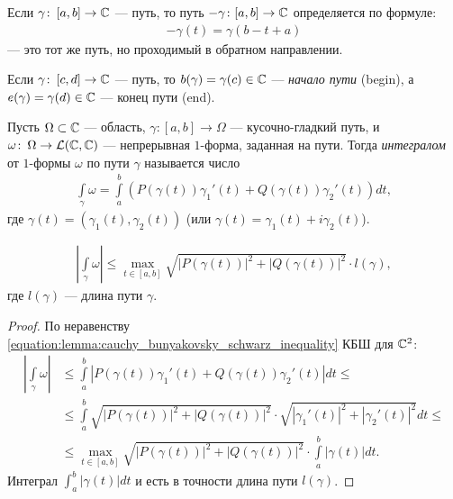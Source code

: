 \begin{notatn*}
 Если $\gamma \colon\, [a,b] \to \mathbb{C}$ --- путь, то путь $-\gamma \colon [a,b] \to \mathbb{C}$ определяется по формуле:
 \begin{align*}
  -\gamma(t) = \gamma(b - t + a)
 \end{align*} --- это тот же путь, но проходимый в обратном направлении.
\end{notatn*}
\begin{notatn*}
 Если $\gamma \colon\, [c, d] \to \mathbb{C}$ --- путь, то $b(\gamma) = \gamma(c) \in \mathbb{C}$ --- \textit{начало пути} (begin), а $e(\gamma) = \gamma(d) \in \mathbb{C}$ --- конец пути (end).
\end{notatn*}
\begin{df*}
 Пусть $\Omega \subset \mathbb{C}$ --- область, $\gamma \colon [a,b] \to \Omega$ --- кусочно-гладкий путь, и $\omega \colon\, \Omega \to \mathcal{L}(\mathbb{C}, \mathbb{C})$  --- непрерывная $1$-форма, заданная на пути. Тогда \textit{интегралом} от $1$-формы $\omega$ по пути  $\gamma$ называется число
  \begin{align*}
  \int\limits_{\gamma} \omega = \int\limits_{a}^{b} \left( P(\gamma(t)) \gamma_1'(t) + Q(\gamma(t)) \gamma_2'(t) \right) dt,
 \end{align*} где $\gamma(t) = (\gamma_1(t),\gamma_2(t))$ (или $\gamma(t) = \gamma_1(t) + i \gamma_2(t)$).
\end{df*}
\begin{lm}
 \begin{align*}
  \left| \int\limits_{\gamma} \omega  \right| \leqslant \max_{t \in [a,b]} \sqrt{\left| P(\gamma(t)) \right|^{2} + \left| Q(\gamma(t)) \right|^{2}} \cdot l(\gamma),
 \end{align*} где $l(\gamma)$ --- длина пути $\gamma$.
\end{lm}
\begin{proof}
 По неравенству \eqref{equation:lemma:cauchy_bunyakovsky_schwarz_inequality} КБШ для $\mathbb{C}^{2}$:
 \begin{align*}
  \left| \int\limits_{\gamma} \omega  \right| &\leqslant \int\limits_{a}^{b} \left| P(\gamma(t))\gamma_1'(t) + Q(\gamma(t))\gamma_2'(t) \right|dt \leqslant \\
  &\leqslant \int\limits_{a}^{b} \sqrt{\left| P(\gamma(t)) \right|^{2} + \left| Q(\gamma(t)) \right|^{2}} \cdot \sqrt{\left| \gamma_1'(t) \right|^{2} + \left| \gamma_2'(t) \right|^{2}} dt \leqslant \\
  &\leqslant \max_{t \in [a,b]} \sqrt{\left| P(\gamma(t)) \right|^{2} + \left| Q(\gamma(t)) \right|^{2}} \cdot \int\limits_{a}^{b} \left| \gamma(t) \right|  dt
 .\end{align*} Интеграл $\int_{a}^{b} \left| \gamma(t) \right|dt$ и есть в точности длина пути $l(\gamma)$.
\end{proof}

